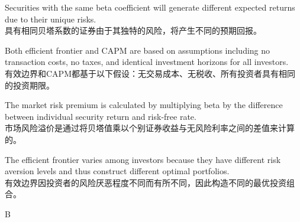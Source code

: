 \documentclass{article}
\begin{document}
    \begin{choices}
        \item Securities with the same beta coefficient will generate different expected returns due to their unique risks.
        \\
        具有相同贝塔系数的证券由于其独特的风险，将产生不同的预期回报。
        \item Both efficient frontier and CAPM are based on assumptions including no transaction costs, no taxes, and identical investment horizons for all investors.
        \\
        有效边界和CAPM都基于以下假设：无交易成本、无税收、所有投资者具有相同的投资期限。
        \item The market risk premium is calculated by multiplying beta by the difference between individual security return and risk-free rate.
        \\
        市场风险溢价是通过将贝塔值乘以个别证券收益与无风险利率之间的差值来计算的。
        \item The efficient frontier varies among investors because they have different risk aversion levels and thus construct different optimal portfolios.
        \\
        有效边界因投资者的风险厌恶程度不同而有所不同，因此构造不同的最优投资组合。
    \end{choices}
    
    \begin{correctanswer}
    B
    \end{correctanswer}
    
\end{document}
